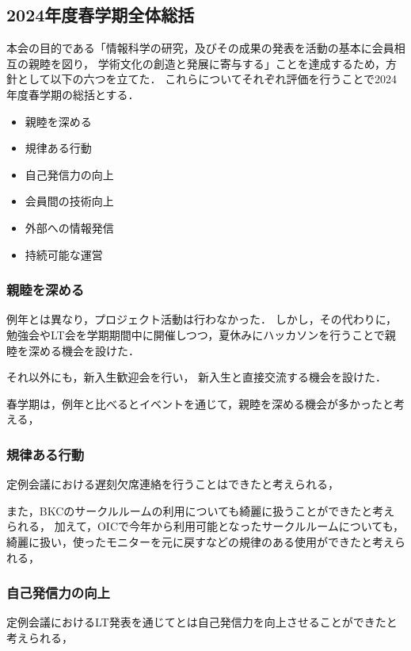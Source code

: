 \subsection*{2024年度春学期全体総括}


本会の目的である「情報科学の研究，及びその成果の発表を活動の基本に会員相互の親睦を図り，
学術文化の創造と発展に寄与する」ことを達成するため，方針として以下の六つを立てた．
これらについてそれぞれ評価を行うことで2024年度春学期の総括とする．

\begin{itemize}
    \item 親睦を深める
    \item 規律ある行動
    \item 自己発信力の向上
    \item 会員間の技術向上
    \item 外部への情報発信
    \item 持続可能な運営
  \end{itemize}


\subsubsection*{親睦を深める}
例年とは異なり，プロジェクト活動は行わなかった．
しかし，その代わりに，勉強会やLT会を学期期間中に開催しつつ，夏休みにハッカソンを行うことで親睦を深める機会を設けた．

それ以外にも，新入生歓迎会を行い， 新入生と直接交流する機会を設けた．

春学期は，例年と比べるとイベントを通じて，親睦を深める機会が多かったと考える，

\subsubsection*{規律ある行動}
定例会議における遅刻欠席連絡を行うことはできたと考えられる，

また，BKCのサークルルームの利用についても綺麗に扱うことができたと考えられる，
加えて，OICで今年から利用可能となったサークルルームについても，綺麗に扱い，使ったモニターを元に戻すなどの規律のある使用ができたと考えられる，

\subsubsection*{自己発信力の向上}
定例会議におけるLT発表を通じて\secondGrade{}と\thirdGrade{}は自己発信力を向上させることができたと考えられる，

